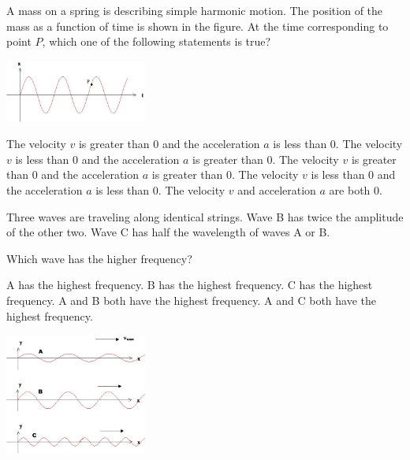 \documentclass[letterpaper,addpoints,answers]{exam}
\begin{document}
\begin{questions}
\begin{question}[5]
\begin{multicols}{2}
A mass on a spring is describing simple harmonic motion. The position of the mass as a function of time is shown in the figure. At the time corresponding to point $P$, which one of the following statements is true?
\begin{center}
\includegraphics[width=0.35\textwidth]{final/oscillation}
\end{center}
\end{multicols}
\begin{checkboxes}
 \correctchoice The velocity $v$ is greater than 0 and the acceleration $a$ is less than 0.
 \choice The velocity $v$ is less than 0 and the acceleration $a$ is greater than 0.
 \choice The velocity $v$ is greater than 0 and the acceleration $a$ is greater than 0.
 \choice The velocity $v$ is less than 0 and the acceleration $a$ is less than 0.
 \choice The velocity $v$ and acceleration $a$ are both 0.
\end{checkboxes}
\end{question}

\pagebreak

\begin{question}[5]
\begin{multicols}{2}
Three waves are traveling along identical strings. Wave B has twice the amplitude of the other two. Wave C has half the wavelength of waves A or B.

Which wave has the higher frequency?
\begin{checkboxes}
 \choice A has the highest frequency.
 \choice B has the highest frequency.
 \correctchoice C has the highest frequency.
 \choice A and B both have the highest frequency.
 \choice A and C both have the highest frequency.
\end{checkboxes}
\begin{center}
\includegraphics[width=0.35\textwidth]{final/waves}
\end{center}
\end{multicols}
\end{question}


\end{questions}
\end{document}
